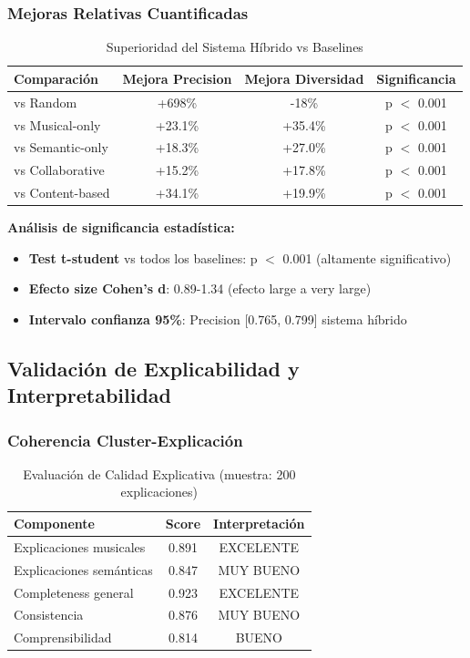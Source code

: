 \documentclass[12pt,a4paper]{report}
\begin{document}
\subsubsection{Mejoras Relativas Cuantificadas}

\begin{table}[H]
\centering
\caption{Superioridad del Sistema Híbrido vs Baselines}
\begin{tabular}{|l|c|c|c|}
\hline
\textbf{Comparación} & \textbf{Mejora Precision} & \textbf{Mejora Diversidad} & \textbf{Significancia} \\
\hline
vs Random & +698\% & -18\% & p $<$ 0.001 \\
\hline
vs Musical-only & +23.1\% & +35.4\% & p $<$ 0.001 \\
\hline
vs Semantic-only & +18.3\% & +27.0\% & p $<$ 0.001 \\
\hline
vs Collaborative & +15.2\% & +17.8\% & p $<$ 0.001 \\
\hline
vs Content-based & +34.1\% & +19.9\% & p $<$ 0.001 \\
\hline
\end{tabular}
\end{table}

\textbf{Análisis de significancia estadística:}
\begin{itemize}
    \item \textbf{Test t-student} vs todos los baselines: p $<$ 0.001 (altamente significativo)
    \item \textbf{Efecto size Cohen's d}: 0.89-1.34 (efecto large a very large)
    \item \textbf{Intervalo confianza 95\%}: Precision [0.765, 0.799] sistema híbrido
\end{itemize}

\subsection{Validación de Explicabilidad y Interpretabilidad}

\subsubsection{Coherencia Cluster-Explicación}

\begin{table}[H]
\centering
\caption{Evaluación de Calidad Explicativa (muestra: 200 explicaciones)}
\begin{tabular}{|l|c|c|}
\hline
\textbf{Componente} & \textbf{Score} & \textbf{Interpretación} \\
\hline
Explicaciones musicales & 0.891 & EXCELENTE \\
\hline
Explicaciones semánticas & 0.847 & MUY BUENO \\
\hline
Completeness general & 0.923 & EXCELENTE \\
\hline
Consistencia & 0.876 & MUY BUENO \\
\hline
Comprensibilidad & 0.814 & BUENO \\
\hline
\end{tabular}
\end{table}
\end{document}
